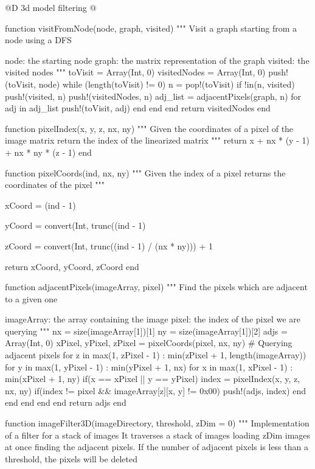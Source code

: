 \documentclass[11pt,oneside]{article}	%
\begin{document}
@D 3d model filtering
@{function visitFromNode(node, graph, visited)
  """
  Visit a graph starting from a node using a DFS

  node: the starting node
  graph: the matrix representation of the graph
  visited: the visited nodes
  """
  toVisit = Array(Int, 0)
  visitedNodes = Array(Int, 0)
  push!(toVisit, node)
  while (length(toVisit) != 0)
    n = pop!(toVisit)
    if !in(n, visited)
      push!(visited, n)
      push!(visitedNodes, n)
      adj_list = adjacentPixels(graph, n)
      for adj in adj_list
        push!(toVisit, adj)
      end
    end
  end
  return visitedNodes
end

function pixelIndex(x, y, z, nx, ny)
  """
  Given the coordinates of a pixel
  of the image matrix return the index
  of the linearized matrix
  """
  return x + nx * (y - 1) + nx * ny * (z - 1)
end

function pixelCoords(ind, nx, ny)
  """
  Given the index of a pixel
  returns the coordinates of the pixel
  """

  xCoord = (ind - 1) %

  yCoord = convert(Int, trunc((ind - 1) %

  zCoord = convert(Int, trunc((ind - 1) / (nx * ny))) + 1

  return xCoord, yCoord, zCoord
end

function adjacentPixels(imageArray, pixel)
  """
  Find the pixels which are adjacent
  to a given one

  imageArray: the array containing the image
  pixel: the index of the pixel we are querying
  """
  nx = size(imageArray[1])[1]
  ny = size(imageArray[1])[2]
  adjs = Array(Int, 0)
  xPixel, yPixel, zPixel = pixelCoords(pixel, nx, ny)
  # Querying adjacent pixels
  for z in max(1, zPixel - 1) : min(zPixel + 1, length(imageArray))
    for y in max(1, yPixel - 1) : min(yPixel + 1, nx)
      for x in max(1, xPixel - 1) : min(xPixel + 1, ny)
        if(x == xPixel || y == yPixel)
          index = pixelIndex(x, y, z, nx, ny)
          if(index != pixel && imageArray[z][x, y] != 0x00)
          push!(adjs, index)
          end
        end
      end
    end
  end
  return adjs
end

function imageFilter3D(imageDirectory, threshold, zDim = 0)
  """
  Implementation of a filter for a stack of images
  It traverses a stack of images loading zDim images
  at once finding the adjacent pixels. If the number of
  adjacent pixels is less than a threshold, the pixels
  will be deleted

}
\end{document}
